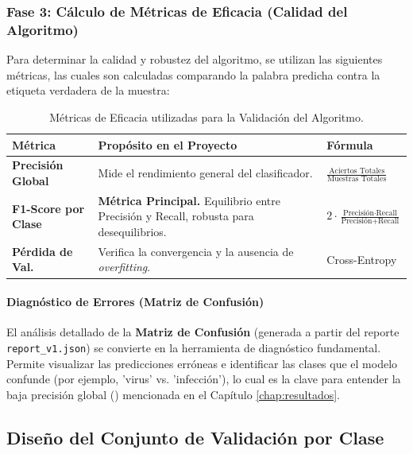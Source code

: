 \subsubsection*{Fase 3: Cálculo de Métricas de Eficacia (Calidad del Algoritmo)}

Para determinar la calidad y robustez del algoritmo, se utilizan las siguientes métricas, las cuales son calculadas comparando la palabra predicha contra la etiqueta verdadera de la muestra:

\begin{table}[H]
    \centering
    \caption{Métricas de Eficacia utilizadas para la Validación del Algoritmo.}
    \label{tab:metricas_eficacia}
    \begin{tabularx}{\textwidth}{|l|X|l|} %
        \hline
        \textbf{Métrica} & \textbf{Propósito en el Proyecto} & \textbf{Fórmula} \\
        \hline
        \textbf{Precisión Global} & Mide el rendimiento general del clasificador. & $\frac{\text{Aciertos Totales}}{\text{Muestras Totales}}$ \\
        \hline
        \textbf{F1-Score por Clase} & \textbf{Métrica Principal.} Equilibrio entre Precisión y Recall, robusta para desequilibrios. & $2 \cdot \frac{\text{Precisión} \cdot \text{Recall}}{\text{Precisión} + \text{Recall}}$ \\
        \hline
        \textbf{Pérdida de Val.} & Verifica la convergencia y la ausencia de \textit{overfitting}. & Cross-Entropy \\
        \hline
    \end{tabularx}
\end{table}
\paragraph{Diagnóstico de Errores (Matriz de Confusión)}
El análisis detallado de la \textbf{Matriz de Confusión} (generada a partir del reporte \texttt{report\_v1.json}) se convierte en la herramienta de diagnóstico fundamental. Permite visualizar las predicciones erróneas e identificar las clases que el modelo confunde (por ejemplo, 'virus' vs. 'infección'), lo cual es la clave para entender la baja precisión global () mencionada en el Capítulo \ref{chap:resultados}.

\subsection{Diseño del Conjunto de Validación por Clase}

